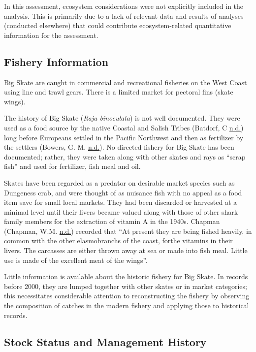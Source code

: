 \documentclass[12pt,]{article}
\begin{document}
In this assessment, ecosystem considerations were not explicitly
included in the analysis. This is primarily due to a lack of relevant
data and results of analyses (conducted elsewhere) that could contribute
ecosystem-related quantitative information for the assessment.

\hypertarget{fishery-information}{%
\subsection{Fishery Information}\label{fishery-information}}

Big Skate are caught in commercial and recreational fisheries on the
West Coast using line and trawl gears. There is a limited market for
pectoral fins (skate wings).

The history of Big Skate (\emph{Raja binoculata}) is not well
documented. They were used as a food source by the native Coastal and
Salish Tribes (Batdorf, C \protect\hyperlink{ref-Batdorf1990}{n.d.})
long before Europeans settled in the Pacific Northwest and then as
fertilizer by the settlers (Bowers, G. M.
\protect\hyperlink{ref-Bowers1904}{n.d.}). No directed fishery for Big
Skate has been documented; rather, they were taken along with other
skates and rays as ``scrap fish'' and used for fertilizer, fish meal and
oil.

Skates have been regarded as a predator on desirable market species such
as Dungeness crab, and were thought of as nuisance fish with no appeal
as a food item save for small local markets. They had been discarded or
harvested at a minimal level until their livers became valued along with
those of other shark family members for the extraction of vitamin A in
the 1940s. Chapman (Chapman, W.M.
\protect\hyperlink{ref-Chapman1942}{n.d.}) recorded that ``At present
they are being fished heavily, in common with the other elasmobranchs of
the coast, forthe vitamins in their livers. The carcasses are either
thrown away at sea or made into fish meal. Little use is made of the
excellent meat of the wings''.

Little information is available about the historic fishery for Big
Skate. In records before 2000, they are lumped together with other
skates or in market categories; this necessitates considerable attention
to reconstructing the fishery by observing the composition of catches in
the modern fishery and applying those to historical records.

\hypertarget{stock-status-and-management-history}{%
\subsection{Stock Status and Management
History}\label{stock-status-and-management-history}}
\end{document}
